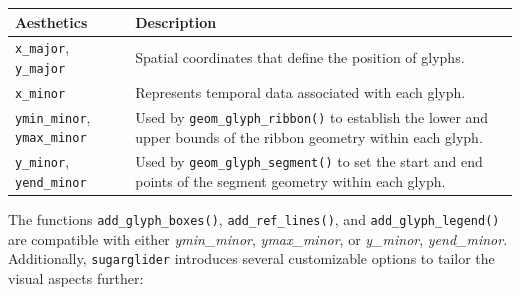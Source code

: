 {\def\LTcaptype{none} %
\begin{longtable}[]{@{}
  >{\raggedright\arraybackslash}p{}
  >{\raggedright\arraybackslash}p{}@{}}
\toprule\noalign{}
\begin{minipage}[b]{\linewidth}\raggedright
Aesthetics
\end{minipage} & \begin{minipage}[b]{\linewidth}\raggedright
Description
\end{minipage} \\
\midrule\noalign{}
\endhead
\bottomrule\noalign{}
\endlastfoot
\texttt{x\_major}, \texttt{y\_major} & Spatial coordinates that define the position of glyphs. \\
\texttt{x\_minor} & Represents temporal data associated with each glyph. \\
\texttt{ymin\_minor}, \texttt{ymax\_minor} & Used by \texttt{geom\_glyph\_ribbon()} to establish the lower and upper bounds of the ribbon geometry within each glyph. \\
\texttt{y\_minor}, \texttt{yend\_minor} & Used by \texttt{geom\_glyph\_segment()} to set the start and end points of the segment geometry within each glyph. \\
\end{longtable}
}

The functions \texttt{add\_glyph\_boxes()}, \texttt{add\_ref\_lines()}, and \texttt{add\_glyph\_legend()} are compatible with either \emph{ymin\_minor}, \emph{ymax\_minor}, or \emph{y\_minor}, \emph{yend\_minor}. Additionally, \texttt{sugarglider} introduces several customizable options to tailor the visual aspects further:

